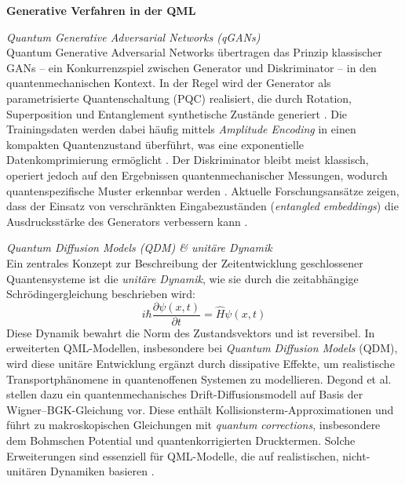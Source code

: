 \vspace{0.6cm}
\noindent
\textbf{Generative Verfahren in der QML}  

\vspace{0.2cm}
\noindent
\textit{Quantum Generative Adversarial Networks (qGANs)}\\
Quantum Generative Adversarial Networks übertragen das Prinzip klassischer GANs – ein Konkurrenzspiel zwischen Generator und Diskriminator – in den quantenmechanischen Kontext. In der Regel wird der Generator als parametrisierte Quantenschaltung (PQC) realisiert, die durch Rotation, Superposition und Entanglement synthetische Zustände generiert \cite{zoufal_quantum_2019}. Die Trainingsdaten werden dabei häufig mittels \textit{Amplitude Encoding} in einen kompakten Quantenzustand überführt, was eine exponentielle Datenkomprimierung ermöglicht \cite{schuld2018}. Der Diskriminator bleibt meist klassisch, operiert jedoch auf den Ergebnissen quantenmechanischer Messungen, wodurch quantenspezifische Muster erkennbar werden \cite{braccia2021}. Aktuelle Forschungsansätze zeigen, dass der Einsatz von verschränkten Eingabezuständen (\textit{entangled embeddings}) die Ausdrucksstärke des Generators verbessern kann \cite{niu_entangling_2022}.

\vspace{0.2cm}
\noindent
\textit{Quantum Diffusion Models (QDM) \& unitäre Dynamik}\\
Ein zentrales Konzept zur Beschreibung der Zeitentwicklung geschlossener Quantensysteme ist die \textit{unitäre Dynamik}, wie sie durch die zeitabhängige Schrödingergleichung beschrieben wird:
\[
i\hbar \frac{\partial \psi(x, t)}{\partial t} = \hat{H} \psi(x, t)
\]
Diese Dynamik bewahrt die Norm des Zustandsvektors und ist reversibel. In erweiterten QML-Modellen, insbesondere bei \textit{Quantum Diffusion Models} (QDM), wird diese unitäre Entwicklung ergänzt durch dissipative Effekte, um realistische Transportphänomene in quantenoffenen Systemen zu modellieren. Degond et al. stellen dazu ein quantenmechanisches Drift-Diffusionsmodell auf Basis der Wigner–BGK-Gleichung vor. Diese enthält Kollisionsterm-Approximationen und führt zu makroskopischen Gleichungen mit \textit{quantum corrections}, insbesondere dem Bohmschen Potential und quantenkorrigierten Drucktermen. Solche Erweiterungen sind essenziell für QML-Modelle, die auf realistischen, nicht-unitären Dynamiken basieren \cite{degond_quantum_2005}.

\vspace{0.7cm}


